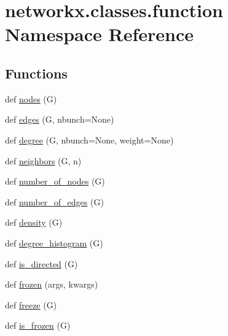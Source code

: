 \hypertarget{namespacenetworkx_1_1classes_1_1function}{}\section{networkx.\+classes.\+function Namespace Reference}
\label{namespacenetworkx_1_1classes_1_1function}
\subsection*{Functions}
\begin{DoxyCompactItemize}
\item 
def \hyperlink{namespacenetworkx_1_1classes_1_1function_a13ec9e314635ecbb194fe675b544d3e5}{nodes} (G)
\item 
def \hyperlink{namespacenetworkx_1_1classes_1_1function_ab909d446533d66c2c860fd617b12baba}{edges} (G, nbunch=None)
\item 
def \hyperlink{namespacenetworkx_1_1classes_1_1function_ab0d09e12435fd33c5f6915608df6fbf3}{degree} (G, nbunch=None, weight=None)
\item 
def \hyperlink{namespacenetworkx_1_1classes_1_1function_a271a8668c32a4a881230a7814dcc4ec4}{neighbors} (G, n)
\item 
def \hyperlink{namespacenetworkx_1_1classes_1_1function_af683224caf58051461a40ab33821115e}{number\+\_\+of\+\_\+nodes} (G)
\item 
def \hyperlink{namespacenetworkx_1_1classes_1_1function_a5acb37106c18fd48082b43f2a2b69fb2}{number\+\_\+of\+\_\+edges} (G)
\item 
def \hyperlink{namespacenetworkx_1_1classes_1_1function_a01d2dff9da6b86469aa19819cfbd2710}{density} (G)
\item 
def \hyperlink{namespacenetworkx_1_1classes_1_1function_a43770941c72d38ec396414f0df0f8bae}{degree\+\_\+histogram} (G)
\item 
def \hyperlink{namespacenetworkx_1_1classes_1_1function_a4a5dbd375698725a35a7d3fd4493ba7c}{is\+\_\+directed} (G)
\item 
def \hyperlink{namespacenetworkx_1_1classes_1_1function_ad8cbe4f6fc7d77111cc5a4dff1a9e125}{frozen} (args, kwargs)
\item 
def \hyperlink{namespacenetworkx_1_1classes_1_1function_a0e337cbcfb1c1f634abeec979d6eacbe}{freeze} (G)
\item 
def \hyperlink{namespacenetworkx_1_1classes_1_1function_a5c8a779487dbd0a50e0e327728477d8b}{is\+\_\+frozen} (G)
\item 

\end{DoxyCompactItemize}
